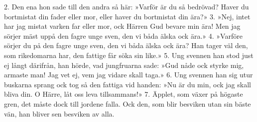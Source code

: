2. Den ena hon sade till den andra så här:
   »Varför är du så bedrövad?
   Haver du bortmistat din fader eller mor,
   eller haver du bortmistat din ära?»
3. »Nej, intet har jag mistat varken far eller mor,
   ock Härren Gud bevare min ära!
   Men jag sörjer mäst uppå den fagre unge sven,
   den vi båda älska ock ära.»
4. »Varföre sörjer du på den fagre unge sven,
   den vi båda älska ock ära?
   Han tager väl den, som rikedomarna har,
   den fattige får söka sin like.»
5. Ung svennen han stod just ej långt därifrån,
   han hörde, vad jungfruarna sade:
   »Gud nåde ock styrke mig, armaste man!
   Jag vet ej, vem jag vidare skall taga.»
6. Ung svennen han sig utur buskarna sprang
   ock tog så den fattiga vid handen:
   »Nu är du min, ock jag skall bliva din.
   O Härre, låt oss leva tillsammans!»
7. Äpplet, som växer på högaste gren,
   det måste dock till jordene falla.
   Ock den, som blir besviken utan sin bäste vän,
   han bliver sen besviken av alla.
